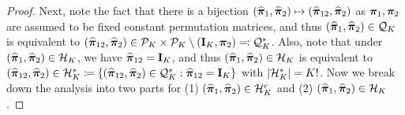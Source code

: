 \documentclass[numsec,webpdf,modern,medium,namedate]{oup-authoring-template}
\theoremstyle{thmstyleone}%
\theoremstyle{thmstyletwo}%
\theoremstyle{thmstylethree}%
\begin{document}
\begin{proof}
Next, note the fact that there is a bijection $(\hatpi_1,\hatpi_2) \mapsto (\hatpi_{12},\hatpi_2)$ as $\bpi_1,\bpi_2$ are assumed to be fixed constant permutation matrices, and thus $(\hatpi_{1},\hatpi_2) \in \calQ_K$ is equivalent to $(\hatpi_{12},\hatpi_2) \in \mathcal{P}_K \times \mathcal{P}_K \setminus \left( \bI_K, \bpi_2 \right) \eqqcolon \calQ^\ast_K$. Also, note that under $(\hatpi_{1},\hatpi_2) \in \calH_K$, we have $\hatpi_{12} = \bI_K$, and thus $(\hatpi_{1},\hatpi_2) \in \calH_K$ is equivalent to $(\hatpi_{12}, \hatpi_2) \in \calH^\ast_K \coloneq \left\{(\hatpi_{12},\hatpi_2) \in \calQ_K^\ast : \hatpi_{12} = \bI_K\right\}$ with $\left|\calH^\ast_K\right| = K!$. Now we break down the analysis into two parts for (1) $ \left( \hatpi_1, \hatpi_2 \right) \in \calH_K^c$ and (2) $ \left( \hatpi_1, \hatpi_2 \right) \in \calH_K$.


\end{proof}
\end{document}
